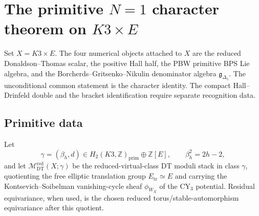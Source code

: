 \providecommand{\C}{\mathbb{C}}
\providecommand{\Z}{\mathbb{Z}}
\providecommand{\Cstar}{\mathbb{C}^{\times}}
\providecommand{\cO}{\mathcal{O}}
\providecommand{\Db}{D^{b}}
\providecommand{\Heq}{H^{*}_{\mathrm{eq}}}
\providecommand{\HBM}{H^{\mathrm{BM}}}
\providecommand{\Mred}{\mathcal{M}^{\mathrm{red}}_{\DT}}
\providecommand{\DT}{\mathrm{DT}}
\providecommand{\CoHA}{\mathrm{CoHA}}
\providecommand{\Yplus}{Y^{+}}
\providecommand{\Ypluscy}{Y^{+}(K3\times E)}
\providecommand{\PhiTenUn}{\Phi_{10}^{\mathrm{un}}}
\providecommand{\PhiTenOP}{\Phi_{10}^{\mathrm{OP}}}
\providecommand{\DeltaFive}{\Delta_{5}}
\providecommand{\DFive}{D_{5}}
\providecommand{\gDeltaFive}{\mathfrak{g}_{\DeltaFive}}
\providecommand{\gBPS}{\mathfrak{g}_{\mathrm{BPS}}}
\providecommand{\phiZO}{\phi_{0,1}}
\providecommand{\kBKM}{\kappa_{\mathrm{BKM}}}
\providecommand{\kch}{\kappa_{\mathrm{ch}}}
\providecommand{\kchHeis}{\kappa_{\mathrm{ch}}^{\mathrm{Heis}}}
\providecommand{\kcat}{\kappa_{\mathrm{cat}}}
\providecommand{\kfib}{\kappa_{\mathrm{fiber}}}
\providecommand{\Mbps}{\mathcal{M}^{+}_{\mathrm{eff}}}
\providecommand{\AutS}{\mathrm{Aut}_{s}}
\providecommand{\NE}{\mathrm{NE}}
\providecommand{\Etr}{E_{\mathrm{tr}}}
\providecommand{\Tred}{T_{\mathrm{red}}}
\providecommand{\smult}{\operatorname{smult}}

\section*{The primitive $N=1$ character theorem on $K3\times E$}
\label{sec:n1-character-k3e}

Set $X=K3\times E$. The four numerical objects attached to $X$ are the
reduced Donaldson--Thomas scalar, the positive Hall half, the PBW
primitive BPS Lie algebra, and the Borcherds--Gritsenko--Nikulin
denominator algebra $\gDeltaFive$. The unconditional common statement is
the character identity. The compact Hall--Drinfeld double and the
bracket identification require separate recognition data.

\subsection*{Primitive data}

Let
\[
 \gamma=(\beta_h,d)\in H_2(K3,\Z)_{\mathrm{prim}}\oplus \Z[E],
 \qquad \beta_h^2=2h-2,
\]
and let $\Mred(X;\gamma)$ be the reduced-virtual-class DT moduli stack in
class $\gamma$, quotienting the free elliptic translation group
$\Etr\simeq E$ and carrying the Kontsevich--Soibelman vanishing-cycle
sheaf $\phi_{W_X}$ of the CY$_3$ potential. Residual equivariance, when
used, is the chosen reduced torus/stable-automorphism equivariance after
this quotient.


